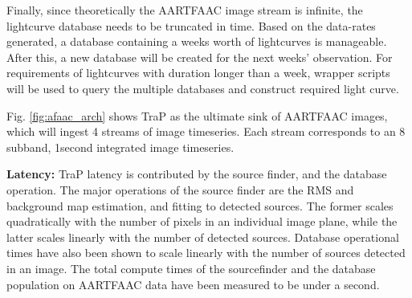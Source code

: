 \documentclass{ws-jai}
\begin{document}
Finally,  since  theoretically  the  AARTFAAC  image  stream  is  infinite,  the
lightcurve database  needs to  be truncated  in time.   Based on  the data-rates
generated, a  database containing  a weeks worth  of lightcurves  is manageable.
After this, a new database will be  created for the next weeks' observation. For
requirements of  lightcurves with duration  longer than a week,  wrapper scripts
will be used to query the multiple databases and construct required light curve.

Fig. \ref{fig:afaac_arch}  shows TraP as  the ultimate sink of  AARTFAAC images,
which will ingest 4 streams of image timeseries. Each stream corresponds to an 8
subband, 1second integrated image timeseries.

\noindent \textbf {Latency:}  TraP latency is contributed by  the source finder,
and the  database operation. The major  operations of the source  finder are the
RMS and background  map estimation, and fitting to detected  sources. The former
scales quadratically  with the number  of pixels  in an individual  image plane,
while the latter scales linearly with  the number of detected sources.  Database
operational times  have also  been shown  to scale linearly  with the  number of
sources detected  in an image. The  total compute times of  the sourcefinder and
the  database population  on AARTFAAC  data  have been  measured to  be under  a
second.


\end{document}
